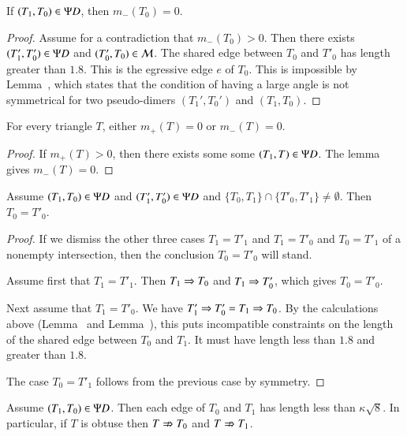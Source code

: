 \begin{lemma}  
If $(T_1,T_0)\in\Psi D$, then $m_-(T_0)=0$.
\end{lemma}

\begin{proof} 
  Assume for a contradiction that $m_-(T_0)>0$.  Then there exists
  $(T'_1,T_0')\in\Psi D$ and $(T'_0,T_0)\in\mathcal M$.  The shared edge between
  $T_0$ and $T'_0$ has length greater than $1.8$.  This is the
  egressive edge $e$ of $T_0$.  This is impossible by
  Lemma~, which states that the condition of having a
  large angle is not symmetrical for two pseudo-dimers $(T_1',T_0')$
  and $(T_1,T_0)$.
\end{proof}

\begin{corollary}  
  For every triangle $T$, either $m_+(T)=0$ or $m_-(T)=0$.
\end{corollary}

\begin{proof}  
  If $m_+(T)>0$, then there exists some some $(T_1,T)\in\Psi D$.  The
  lemma gives $m_-(T)=0$.
\end{proof}

\begin{lemma}  
  Assume $(T_1,T_0)\in \Psi D$ and $(T'_1,T'_0)\in\Psi D$ and
  $\{T_0,T_1\}\cap\{T'_0,T'_1\} \ne \emptyset$.  Then $T_0 = T'_0$.
\end{lemma}

\begin{proof}  
  If we dismiss the other three cases $T_1=T'_1$ and $T_1=T'_0$ and
  $T_0=T'_1$ of a nonempty intersection, then the conclusion $T_0 =
  T'_0$ will stand.

  Assume first that $T_1 = T'_1$.  Then $T_1\Rightarrow T_0$ and $T_1\Rightarrow
  T'_0$, which gives $T_0=T'_0$.

  Next assume that $T_1=T'_0$.  We have $T'_1\Rightarrow T'_0 = T_1 \Rightarrow T_0$.
  By the calculations above (Lemma~ and
  Lemma~), this puts incompatible constraints on the
  length of the shared edge between $T_0$ and $T_1$.  It must have
  length less than $1.8$ and greater than $1.8$.

  The case $T_0=T'_1$ follows from the previous case by symmetry.
\end{proof}

\begin{lemma}
  Assume $(T_1,T_0)\in\Psi D$.  Then each edge of $T_0$ and $T_1$ has
  length less than $\kappa\sqrt8$.  In particular, if $T$ is obtuse
  then $T\nRightarrow T_0$ and $T \nRightarrow T_1$.
\end{lemma}


